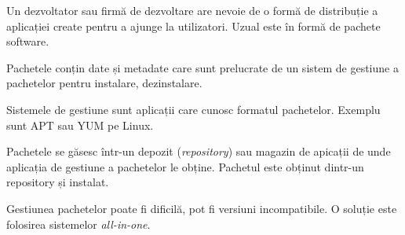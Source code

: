 Un dezvoltator sau firmă de dezvoltare are nevoie de o formă de distribuție a aplicației create pentru a ajunge la utilizatori. Uzual este în formă de pachete software.

Pachetele conțin date și metadate care sunt prelucrate de un sistem de gestiune a pachetelor pentru instalare, dezinstalare.

Sistemele de gestiune sunt aplicații care cunosc formatul pachetelor. Exemplu sunt APT sau YUM pe Linux.

Pachetele se găsesc într-un depozit (\textit{repository}) sau magazin de apicații de unde aplicația de gestiune a pachetelor le obține. Pachetul este obținut dintr-un repository și instalat.

Gestiunea pachetelor poate fi dificilă, pot fi versiuni incompatibile. O soluție este folosirea sistemelor \textit{all-in-one}.
